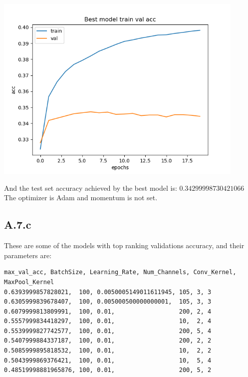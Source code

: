 \documentclass[]{article}
\begin{document}
        \begin{center}
            \includegraphics[width=12cm]{a6plots/20-16-57-May-22-2021-Single Hidden-best-acc.png}
        \end{center}
        And the test set accuracy achieved by the best model is: $0.34299998730421066$
        The optimizer is Adam and momentum is not set. 
    \subsection{A.7.c}
        These are some of the models with top ranking validations accuracy, and their parameters are: 
        \begin{lstlisting}
max_val_acc, BatchSize, Learning_Rate, Num_Channels, Conv_Kernel, MaxPool_Kernel
0.6393999857828021,  100, 0.0050005149011611945, 105, 3, 3
0.6305999839678407,  100, 0.005000500000000001,  105, 3, 3
0.6079999813809991,  100, 0.01,                  200, 2, 4
0.5557999834418297,  100, 0.01,                  10,  2, 4
0.5539999827742577,  100, 0.01,                  200, 5, 4
0.5407999884337187,  100, 0.01,                  200, 2, 2
0.5085999895818532,  100, 0.01,                  10,  2, 2
0.5043999869376421,  100, 0.01,                  10,  5, 4
0.48519998881965876, 100, 0.01,                  200, 5, 2
        \end{lstlisting}
\end{document}
